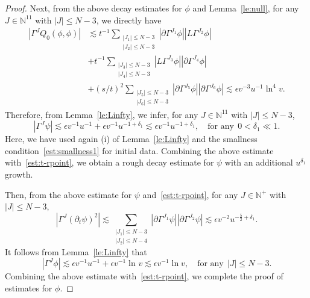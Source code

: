 \documentclass[10pt,a4paper]{amsart}
\def \pt{\partial_{t}}
\begin{document}
\begin{proof}
\smallskip
Next, from the above decay estimates for $\phi$ and Lemma~\ref{le:null}, for any $J\in \mathbb{N}^{11}$ with $|J|\le N-3$, we directly have
\begin{equation*}
\begin{aligned}
     |\Gamma^{J}Q_{0}(\phi,\phi)|
    &\lesssim t^{-1}\sum_{\substack{|J_{1}|\le N-3\\ |J_{2}|\le N-3}}
    |\partial \Gamma^{J_{1}}\phi|
    |L\Gamma^{J_{2}}\phi|\\
    &+t^{-1}\sum_{\substack{|J_{3}|\le N-3\\ |J_{4}|\le N-3}}
    |L\Gamma^{J_{3}}\phi|
    |\partial\Gamma^{J_{4}}\phi|\\
    &+(s/t)^{2}\sum_{\substack{|J_{5}|\le N-3\\ |J_{6}|\le N-3}}
    |\partial\Gamma^{J_{5}}\phi|
    |\partial\Gamma^{J_{6}}\phi|\lesssim \epsilon v^{-3}u^{-1}\ln^{4}v.
\end{aligned}
\end{equation*}
Therefore, from Lemma~\ref{le:Linfty},  we infer, for any $J\in \mathbb{N}^{11}$ with $|J|\le N-3$,
\begin{equation*}
    \left| \Gamma^{J}\psi\right|\lesssim \epsilon v^{-1}u^{-1}+\epsilon v^{-1}u^{-1+\delta_{1}}\lesssim \epsilon v^{-1}u^{-1+\delta_{1}},\quad \mbox{for any}\ \ 0<\delta_{1}\ll 1.
\end{equation*}
Here, we have used again (i) of Lemma~\ref{le:Linfty} and the smallness condition~\eqref{est:smallness1} for initial data.
Combining the above estimate with~\eqref{est:t-rpoint}, we obtain a rough decay estimate for $\psi$ with an additional $u^{\delta_{1}}$ growth.

\smallskip
Then, from the above estimate for $\psi$ and~\eqref{est:t-rpoint}, for any $J\in \mathbb{N}^{+}$ with $|J|\le N-3$, 
\begin{equation*}
    \left| \Gamma^{J}(\pt \psi )^{2}\right|
    \lesssim \sum_{\substack{|J_{1}|\le N-3\\ |J_{2}|\le N-4}}
    \left|\partial \Gamma^{J_{1}}\psi\right|
    \left|\partial \Gamma^{J_{2}}\psi\right|
    \lesssim \epsilon v^{-2}u^{-\frac{5}{2}+\delta_{1}}.
\end{equation*}
It follows from Lemma~\ref{le:Linfty} that 
\begin{equation*}
    \left|\Gamma^{J}\phi\right|
    \lesssim 
    \epsilon v^{-1}u^{-1}+
    \epsilon v^{-1}\ln^{}v
    \lesssim \epsilon v^{-1}\ln v,\quad 
    \mbox{for any} \ \ |J|\le N-3.
\end{equation*}
Combining the above estimate with~\eqref{est:t-rpoint}, we complete the proof of estimates for $\phi$.


\end{proof}
\end{document}
